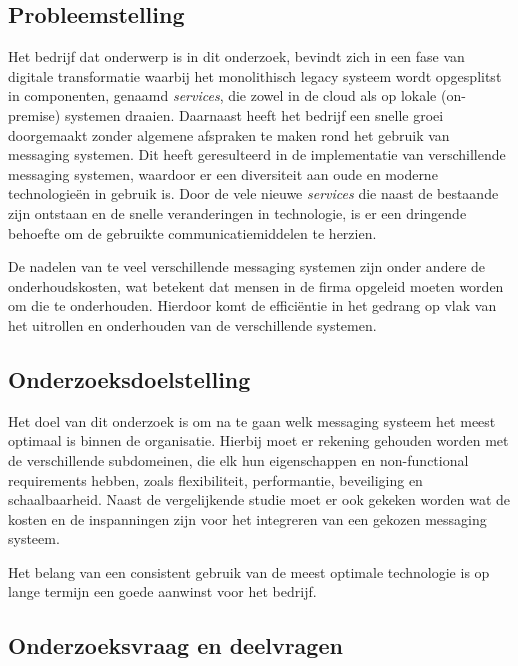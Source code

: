 \subsection{Probleemstelling}
Het bedrijf dat onderwerp is in dit onderzoek, bevindt zich in een fase van digitale transformatie 
waarbij het monolithisch legacy systeem wordt opgesplitst in componenten, genaamd \emph{services}, 
die zowel in de cloud als op lokale (on-premise) systemen draaien. Daarnaast heeft het bedrijf een snelle groei 
doorgemaakt zonder algemene afspraken te maken rond het gebruik van messaging systemen. Dit heeft geresulteerd in de 
implementatie van verschillende messaging systemen, waardoor er een diversiteit aan oude en moderne technologieën in gebruik is. 
Door de vele nieuwe \emph{services} die naast de bestaande zijn ontstaan en de snelle veranderingen in technologie, 
is er een dringende behoefte om de gebruikte communicatiemiddelen te herzien. 
\newline

De nadelen van te veel verschillende messaging systemen zijn onder andere de onderhoudskosten, wat betekent 
dat mensen in de firma opgeleid moeten worden om die te onderhouden. 
Hierdoor komt de efficiëntie in het gedrang op vlak van het uitrollen en onderhouden van de verschillende systemen.
\newline 

\subsection{Onderzoeksdoelstelling}
Het doel van dit onderzoek is om na te gaan welk messaging systeem het meest optimaal is binnen de organisatie. 
Hierbij moet er rekening gehouden worden met de verschillende subdomeinen, die elk hun eigenschappen en \newline non-functional requirements 
hebben, zoals flexibiliteit, performantie, beveiliging en schaalbaarheid.
Naast de vergelijkende studie moet er ook gekeken worden wat de kosten en de inspanningen zijn 
voor het integreren van een gekozen messaging systeem. \newline 

Het belang van een consistent gebruik van de meest optimale technologie is op lange termijn
een goede aanwinst voor het bedrijf. 

\subsection{Onderzoeksvraag en deelvragen}

